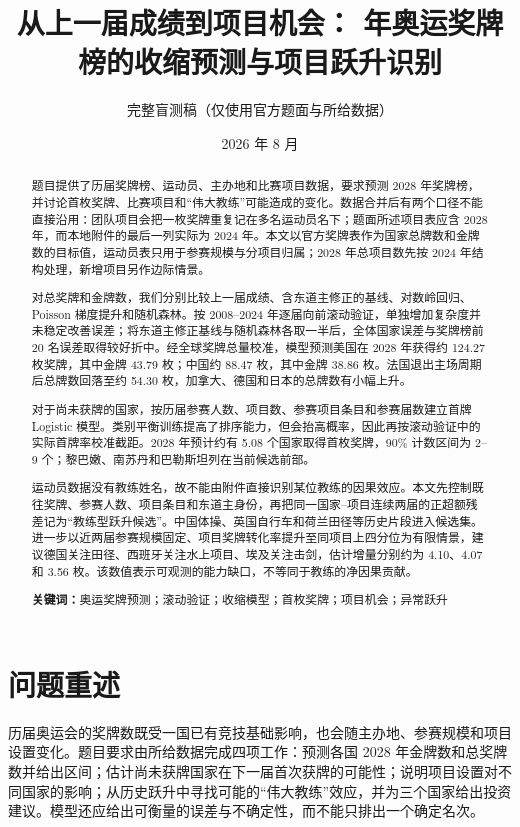 \documentclass[UTF8,11pt,a4paper]{ctexart}
\title{从上一届成绩到项目机会：\newline 2028 年奥运奖牌榜的收缩预测与项目跃升识别}
\author{完整盲测稿（仅使用官方题面与所给数据）}
\date{2026 年 8 月}
\newcommand{\keywords}[1]{\par\noindent\textbf{关键词：}#1}
\begin{document}
\maketitle

\begin{abstract}
题目提供了历届奖牌榜、运动员、主办地和比赛项目数据，要求预测 2028 年奖牌榜，并讨论首枚奖牌、比赛项目和“伟大教练”可能造成的变化。数据合并后有两个口径不能直接沿用：团队项目会把一枚奖牌重复记在多名运动员名下；题面所述项目表应含 2028 年，而本地附件的最后一列实际为 2024 年。本文以官方奖牌表作为国家总牌数和金牌数的目标值，运动员表只用于参赛规模与分项目归属；2028 年总项目数先按 2024 年结构处理，新增项目另作边际情景。

对总奖牌和金牌数，我们分别比较上一届成绩、含东道主修正的基线、对数岭回归、Poisson 梯度提升和随机森林。按 2008--2024 年逐届向前滚动验证，单独增加复杂度并未稳定改善误差；将东道主修正基线与随机森林各取一半后，全体国家误差与奖牌榜前 20 名误差取得较好折中。经全球奖牌总量校准，模型预测美国在 2028 年获得约 124.27 枚奖牌，其中金牌 43.79 枚；中国约 88.47 枚，其中金牌 38.86 枚。法国退出主场周期后总牌数回落至约 54.30 枚，加拿大、德国和日本的总牌数有小幅上升。

对于尚未获牌的国家，按历届参赛人数、项目数、参赛项目条目和参赛届数建立首牌 Logistic 模型。类别平衡训练提高了排序能力，但会抬高概率，因此再按滚动验证中的实际首牌率校准截距。2028 年预计约有 5.08 个国家取得首枚奖牌，90\% 计数区间为 2--9 个；黎巴嫩、南苏丹和巴勒斯坦列在当前候选前部。

运动员数据没有教练姓名，故不能由附件直接识别某位教练的因果效应。本文先控制既往奖牌、参赛人数、项目条目和东道主身份，再把同一国家--项目连续两届的正超额残差记为“教练型跃升候选”。中国体操、英国自行车和荷兰田径等历史片段进入候选集。进一步以近两届参赛规模固定、项目奖牌转化率提升至同项目上四分位为有限情景，建议德国关注田径、西班牙关注水上项目、埃及关注击剑，估计增量分别约为 4.10、4.07 和 3.56 枚。该数值表示可观测的能力缺口，不等同于教练的净因果贡献。

\keywords{奥运奖牌预测；滚动验证；收缩模型；首枚奖牌；项目机会；异常跃升}
\end{abstract}

\tableofcontents
\newpage

\section{问题重述}

历届奥运会的奖牌数既受一国已有竞技基础影响，也会随主办地、参赛规模和项目设置变化。题目要求由所给数据完成四项工作：预测各国 2028 年金牌数和总奖牌数并给出区间；估计尚未获牌国家在下一届首次获牌的可能性；说明项目设置对不同国家的影响；从历史跃升中寻找可能的“伟大教练”效应，并为三个国家给出投资建议。模型还应给出可衡量的误差与不确定性，而不能只排出一个确定名次。
\end{document}
